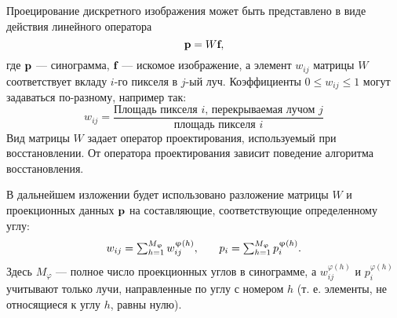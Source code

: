 Проецирование дискретного изображения может быть представлено в виде действия линейного оператора
\begin{equation}\label{eq:linear_system}
\textbf p = W \textbf f,
\end{equation}
где $\textbf p$ --- синограмма, $\textbf f$ --- искомое изображение, а элемент $w_{ij}$ матрицы $W$ соответствует вкладу $i$-го пикселя в $j$-ый луч. Коэффициенты $0 \leq w_{ij} \leq 1$ могут задаваться по-разному, например так:
\begin{equation}
\label{eq:coeff}
w_{ij} = \frac{\text{Площадь пикселя $i$, перекрываемая лучом $j$}}{\text{площадь пикселя $i$}}
\end{equation}
Вид матрицы $W$ задает оператор проектирования, используемый при восстановлении. От оператора проектирования зависит поведение алгоритма восстановления.

В дальнейшем изложении будет использовано разложение матрицы $W$ и проекционных данных $\textbf p$ на составляющие, соответствующие определенному углу:
\begin{equation} \notag
\begin{array}{l l}
w_{ij} = \sum_{h = 1}^{M_\varphi} {w_{ij}^{\varphi(h)}}, & \quad
p_i = \sum_{h = 1}^{M_\varphi} {p_i^{\varphi(h)}}.
\end{array}
\end{equation}
Здесь $M_\varphi$ ---  полное число проекционных углов в синограмме, а  $w_{ij}^{\varphi(h)}$ и $p_i^{\varphi(h)}$ учитывают только лучи, направленные по углу с номером $h$ (т. е. элементы, не относящиеся к углу $h$, равны нулю).

